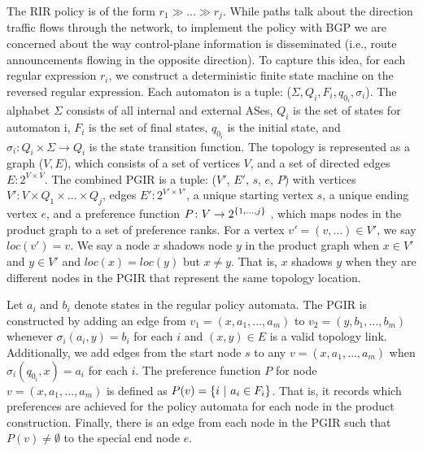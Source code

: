 The RIR policy is of the form $r_1 \gg \dots \gg r_j$. While paths talk about the direction traffic flows through the network, to implement the policy with BGP we are concerned about the way control-plane information is disseminated (i.e., route announcements flowing in the opposite direction). To capture this idea, for each regular expression $r_i$, we construct a deterministic finite state machine on the reversed regular expression. Each automaton is a tuple: ($\Sigma, Q_i, F_i, q_{0_i}, \sigma_i$). The alphabet $\Sigma$ consists of all internal and external ASes,  $Q_i$ is the set of states for automaton i, $F_i$ is the set of final states, $q_{0_i}$ is the initial state, and $\sigma_i \colon Q_i \times \Sigma \rightarrow Q_i$ is the state transition function.
%
The topology is represented as a graph ($V, E$), which consists of a set of vertices $V$, and a set of directed edges $E \colon 2^{V \times V}$.
%
The combined PGIR is a tuple: ($V'$, $E'$, $s$, $e$, $P$) with
vertices $V' \colon V \times Q_1 \times \dots \times Q_j$,
edges $E' \colon 2^{V' \times V'}$,
a unique starting vertex $s$,
a unique ending vertex $e$,
and a preference function $P \colon V \rightarrow 2^{\{ 1, \dots, j \} }$ , which maps nodes in the product graph to a set of preference ranks.
For a vertex $v' = (v, \dots) \in V'$, we say $loc(v') = v$. We say a node $x$ shadows node $y$ in the product graph when $x \in V'$ and $y \in V'$ and $loc(x) = loc(y)$ but $x \neq y$. That is, $x$ shadows $y$ when they are different nodes in the PGIR that represent the same topology location.


Let $a_i$ and $b_i$ denote states in the regular policy automata.
The PGIR is constructed by adding an edge from $v_1 = (x, a_1, \dots, a_m)$ to $v_2 = (y, b_1, \dots, b_m)$ whenever $\sigma_i(a_i, y) = b_i$ for each $i$ and $(x,y) \in E$ is a valid topology link.
%
Additionally, we add edges from the start node $s$ to any $v = (x, a_1, \dots, a_m)$ when $\sigma_i(q_{0_i}, x) = a_i$ for each $i$.
%
The preference function $P$ for node $v = (x, a_1, \dots, a_m)$ is defined as $P(v) = \{ i~\vert~a_i \in F_i \}  $. That is, it records which preferences are achieved for the policy automata for each node in the product construction.
%
Finally, there is an edge from each node in the PGIR such that $P(v) \neq \emptyset$ to the special end node $e$.


